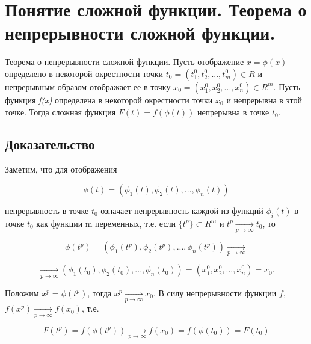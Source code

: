\section{Понятие сложной функции. Теорема о непрерывности сложной функции.}

Теорема о непрерывности сложной функции. 
Пусть отображение $x = \phi (x)$ определено в некоторой окрестности точки $t_0 = (t^0_1, t^0_2, ..., t^0_m) \in R$ и непрерывным образом отображает ее в точку $x_0 = (x_1^0, x_2^0, ..., x_n^0) \in R^m$. Пусть функция \emph{f(x)} определена в некоторой окрестности точки $x_0$ и непрерывна в этой точке. Тогда сложная функция $F(t) = f(\phi (t))$ непрерывна в точке $t_0$.

\subsection{Доказательство}

Заметим, что для отображения 

\begin{displaymath}
    \phi (t) = (\phi _1(t), \phi _2(t), ..., \phi _n(t))
\end{displaymath}

непрерывность в точке $t_0$ означает непрерывность каждой из функций $\phi _i(t)$ в точке $t_0$ как функции m переменных, т.е. если $\{t^p\} \subset R^m$ и $t^p \underset{p \rightarrow \infty}{\longrightarrow} t_0$, то

\begin{displaymath}
    \phi (t^p) = (\phi _1(t^p), \phi _2(t^p), ..., \phi _n(t^p)) \underset{p \rightarrow \infty}{\longrightarrow} 
\end{displaymath}

\begin{displaymath}
    \underset{p \rightarrow \infty}{\longrightarrow} (\phi _1(t_0), \phi _2(t_0), ..., \phi _n(t_0)) = (x_1^0, x_2^0, ..., x_n^0) = x_0.
\end{displaymath}

Положим $x^p = \phi (t^p)$, тогда $x^p \underset{p \rightarrow \infty}{\longrightarrow} x_0$. В силу непрерывности функции $f$, $f(x^p) \underset{p \rightarrow \infty}{\longrightarrow} f(x_0)$, т.е. 

\begin{displaymath}
    F(t^p) = f(\phi (t^p)) \underset{p \rightarrow \infty}{ \longrightarrow} f(x_0) = f(\phi (t_0)) = F(t_0)
\end{displaymath}